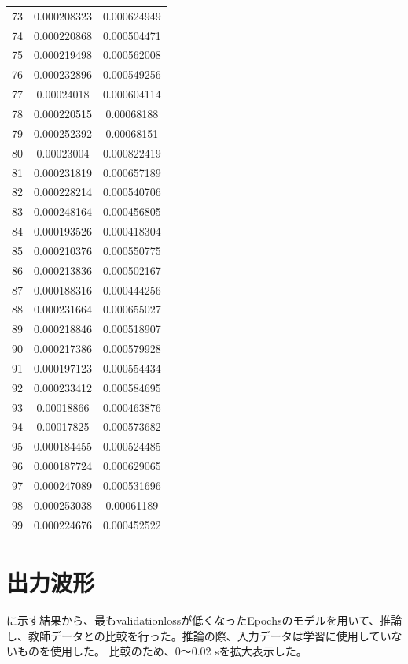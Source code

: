 \documentclass{jreport}		%
\begin{document}
\begin{table}
\begin{tabular}{c|cc}
73&0.000208323&0.000624949 \\
74&0.000220868&0.000504471 \\
75&0.000219498&0.000562008 \\
76&0.000232896&0.000549256 \\
77&0.00024018&0.000604114 \\
78&0.000220515&0.00068188 \\
79&0.000252392&0.00068151 \\
80&0.00023004&0.000822419 \\
81&0.000231819&0.000657189 \\
82&0.000228214&0.000540706 \\
83&0.000248164&0.000456805 \\
84&0.000193526&0.000418304 \\
85&0.000210376&0.000550775 \\
86&0.000213836&0.000502167 \\
87&0.000188316&0.000444256 \\
88&0.000231664&0.000655027 \\
89&0.000218846&0.000518907 \\
90&0.000217386&0.000579928 \\
91&0.000197123&0.000554434 \\
92&0.000233412&0.000584695 \\
93&0.00018866&0.000463876 \\
94&0.00017825&0.000573682 \\
95&0.000184455&0.000524485 \\
96&0.000187724&0.000629065 \\
97&0.000247089&0.000531696 \\
98&0.000253038&0.00061189 \\
99&0.000224676&0.000452522 \\ \hline
  \end{tabular}
\end{table}

\clearpage
\section{出力波形}
に示す結果から、最もvalidationlossが低くなったEpochsのモデルを用いて、推論し、教師データとの比較を行った。推論の際、入力データは学習に使用していないものを使用した。
比較のため、0～0.02 sを拡大表示した。
\end{document}
